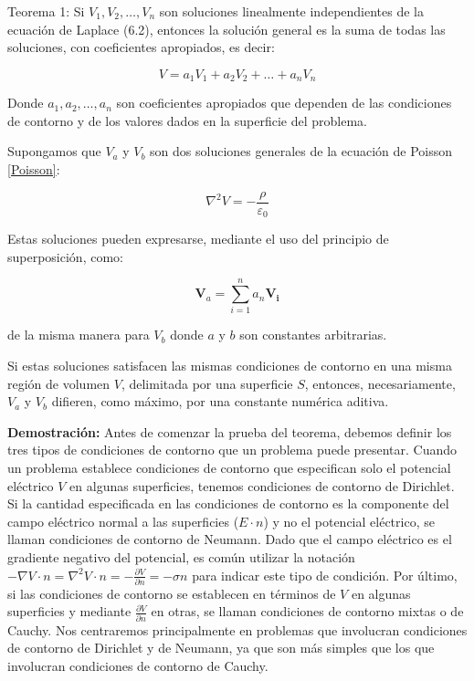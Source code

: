 \documentclass[a4,12pt]{aleph-notas}
\begin{document}
\begin{teo}
    Teorema 1: Si \(V_1, V_2, \ldots, V_n\) son soluciones linealmente independientes de la ecuación de Laplace (6.2), entonces la solución general es la suma de todas las soluciones, con coeficientes apropiados, es decir:

\[V = a_1 V_1 + a_2 V_2 + \ldots + a_n V_n\]

Donde \(a_1, a_2, \ldots, a_n\) son coeficientes apropiados que dependen de las condiciones de contorno y de los valores dados en la superficie del problema.

\end{teo}

\begin{teo}
    Supongamos que \(V_a\) y \(V_b\) son dos soluciones generales de la ecuación de Poisson \ref{Poisson}:

    \[
    \nabla^2 V = -\frac{\rho}{\varepsilon_0}
    \]
    
    Estas soluciones pueden expresarse, mediante el uso del principio de superposición, como:
    
    \[
    \mathbf{V}_a=\sum_{i=1}^{n}a_n \mathbf{V_i}
    \]
    
    de la misma manera para $V_b$ donde \(a\) y \(b\) son constantes arbitrarias.
    
    Si estas soluciones satisfacen las mismas condiciones de contorno en una misma región de volumen \(V\), delimitada por una superficie \(S\), entonces, necesariamente, \(V_a\) y \(V_b\) difieren, como máximo, por una constante numérica aditiva.
    
\end{teo}

\textbf{Demostración:} Antes de comenzar la prueba del teorema, debemos definir los tres tipos de condiciones de contorno que un problema puede presentar. Cuando un problema establece condiciones de contorno que especifican solo el potencial eléctrico \(V\) en algunas superficies, tenemos condiciones de contorno de Dirichlet. Si la cantidad especificada en las condiciones de contorno es la componente del campo eléctrico normal a las superficies (\(E \cdot n\)) y no el potencial eléctrico, se llaman condiciones de contorno de Neumann. Dado que el campo eléctrico es el gradiente negativo del potencial, es común utilizar la notación \(-\nabla V \cdot n = \nabla^2 V \cdot n = -\frac{\partial V}{\partial n} = -\sigma n\) para indicar este tipo de condición. Por último, si las condiciones de contorno se establecen en términos de \(V\) en algunas superficies y mediante \(\frac{\partial V}{\partial n}\) en otras, se llaman condiciones de contorno mixtas o de Cauchy. Nos centraremos principalmente en problemas que involucran condiciones de contorno de Dirichlet y de Neumann, ya que son más simples que los que involucran condiciones de contorno de Cauchy.
\end{document}
